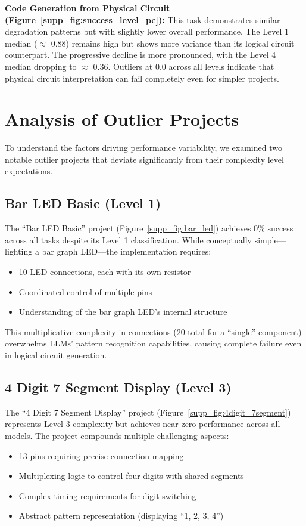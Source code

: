 \documentclass{article} %
\begin{document}
\textbf{Code Generation from Physical Circuit (Figure~\ref{supp_fig:success_level_pc}):}
This task demonstrates similar degradation patterns but with slightly lower overall performance. The Level 1 median ($\approx$ 0.88) remains high but shows more variance than its logical circuit counterpart. The progressive decline is more pronounced, with the Level 4 median dropping to $\approx$ 0.36. Outliers at 0.0 across all levels indicate that physical circuit interpretation can fail completely even for simpler projects.


\section{Analysis of Outlier Projects}
To understand the factors driving performance variability, we examined two notable outlier projects that deviate significantly from their complexity level expectations.

\subsection{Bar LED Basic (Level 1)}
The ``Bar LED Basic'' project (Figure~\ref{supp_fig:bar_led}) achieves 0\% success across all tasks despite its Level 1 classification. While conceptually simple---lighting a bar graph LED---the implementation requires:
\begin{itemize}
    \item 10 LED connections, each with its own resistor
    \item Coordinated control of multiple pins
    \item Understanding of the bar graph LED's internal structure
\end{itemize}
This multiplicative complexity in connections (20 total for a ``single'' component) overwhelms LLMs' pattern recognition capabilities, causing complete failure even in logical circuit generation.

\subsection{4 Digit 7 Segment Display (Level 3)}
The ``4 Digit 7 Segment Display'' project (Figure~\ref{supp_fig:4digit_7segment}) represents Level 3 complexity but achieves near-zero performance across all models. The project compounds multiple challenging aspects:

\begin{itemize}
    \item 13 pins requiring precise connection mapping
    \item Multiplexing logic to control four digits with shared segments
    \item Complex timing requirements for digit switching
    \item Abstract pattern representation (displaying ``1, 2, 3, 4'')
\end{itemize}
\end{document}
